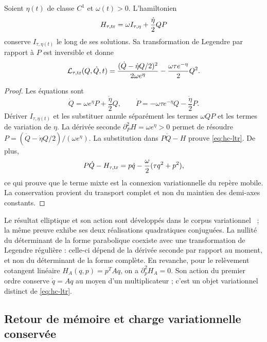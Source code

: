 \begin{theorem}
\label{thm:hc-legendre}
Soient \(\eta(t)\) de classe \(C^1\) et \(\omega(t)>0\). L’hamiltonien
\begin{equation}
 H_{\tau,\rm tr}
 =\omega I_{\tau,\eta}+\frac{\dot\eta}{2}QP
 \label{eq:hc-htr}
\end{equation}
conserve \(I_{\tau,\eta(t)}\) le long de ses solutions. Sa
transformation de Legendre par rapport à \(P\) est inversible et donne
\begin{equation}
 \mathcal L_{\tau,\rm tr}(Q,\dot Q,t)
 =\frac{(\dot Q-\dot\eta Q/2)^2}{2\omega e^\eta}
 -\frac{\omega\tau e^{-\eta}}2Q^2.
 \label{eq:hc-ltr}
\end{equation}
\end{theorem}
\begin{proof}
Les équations sont
\[
 \dot Q=\omega e^\eta P+\frac{\dot\eta}2Q,
 \qquad
 \dot P=-\omega\tau e^{-\eta}Q-\frac{\dot\eta}2P.
\]
Dériver \(I_{\tau,\eta(t)}\) et les substituer annule séparément
les termes \(\omega QP\) et les termes de variation de \(\eta\).
La dérivée seconde \(\partial_P^2H=\omega e^\eta>0\)
permet de résoudre
\(P=(\dot Q-\dot\eta Q/2)/(\omega e^\eta)\).
La substitution dans \(P\dot Q-H\) prouve \eqref{eq:hc-ltr}.
De plus,
\[
 P\dot Q-H_{\tau,\rm tr}
 =p\dot q-\frac\omega2(\tau q^2+p^2),
\]
ce qui prouve que le terme mixte est la connexion variationnelle du repère
mobile. La conservation provient du transport complet et non du maintien
des demi-axes constants.
\end{proof}

Le résultat elliptique et son action sont développés dans le corpus variationnel~\cite{hmtX} ; la même preuve exhibe ses deux réalisations quadratiques conjuguées. La nullité du déterminant de la forme parabolique coexiste avec une transformation de Legendre régulière : celle-ci dépend de la dérivée seconde par rapport au moment, et non du déterminant de la forme complète. En revanche, pour le relèvement cotangent linéaire \(H_A(q,p)=p^TAq\), on a \(\partial_p^2H_A=0\). Son action du premier ordre conserve \(\dot q=Aq\) au moyen d'un multiplicateur ; c'est un objet variationnel distinct de \eqref{eq:hc-ltr}.

\subsection{Retour de mémoire et charge variationnelle conservée}

